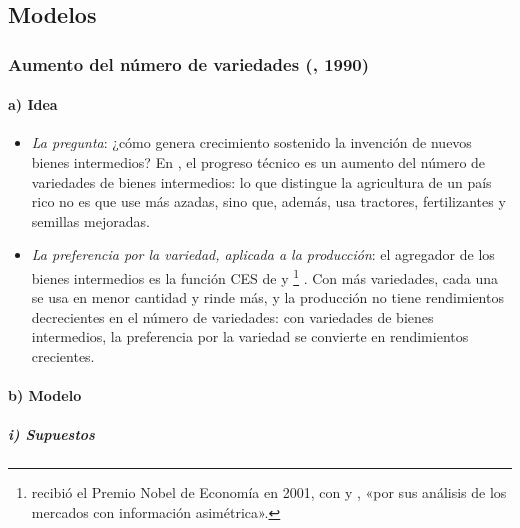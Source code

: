\documentclass[11pt]{article}
\begin{document}
\subsection{Modelos}\label{sec:sg-modelos}

\subsubsection{Aumento del número de variedades (, 1990)}\label{sec:romer}

\paragraph{a) Idea}

\begin{itemize}
\item \emph{La pregunta}: ¿cómo genera crecimiento sostenido la invención de nuevos bienes intermedios? En \textcite{Romer1990}, el progreso técnico es un aumento del número de variedades de bienes intermedios: lo que distingue la agricultura de un país rico no es que use más azadas, sino que, además, usa tractores, fertilizantes y semillas mejoradas.
\item \emph{La preferencia por la variedad, aplicada a la producción}: el agregador de los bienes intermedios es la función CES de  y \footnote{ recibió el Premio Nobel de Economía en 2001, con  y , «por sus análisis de los mercados con información asimétrica»\nocite{Nobel2001AkerlofSpenceStiglitz}.} . Con más variedades, cada una se usa en menor cantidad y rinde más, y la producción no tiene rendimientos decrecientes en el número de variedades: con variedades de bienes intermedios, la preferencia por la variedad se convierte en rendimientos crecientes.
\end{itemize}

\paragraph{b) Modelo}

\subparagraph{i) Supuestos}
\end{document}

